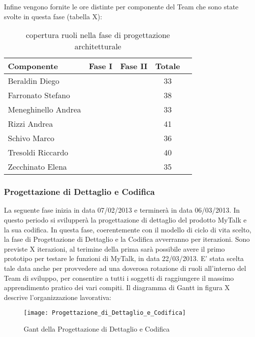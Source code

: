 Infine vengono fornite le ore distinte per componente del Team che sono state svolte in questa fase (tabella X):\\
\begin{table}[h]
\centering
\begin{tabular}{|l|c|c|cl|}
\hline
Componente& Fase I& Fase II& Totale& \\
\hline
Beraldin Diego & & & 33&\\
Farronato Stefano & & & 38&\\
Meneghinello Andrea & & & 33&\\
Rizzi Andrea & & & 41&\\
Schivo Marco & & & 36&\\
Tresoldi Riccardo & & & 40&\\
Zecchinato Elena & & & 35&\\
\hline
\end{tabular}
\caption{copertura ruoli nella fase di progettazione architetturale}
\end{table}


\subsubsection{Progettazione di Dettaglio e Codifica}
La seguente fase inizia in data 07/02/2013 e terminerà in data 06/03/2013. In questo periodo si svilupperà la progettazione di dettaglio del prodotto MyTalk e la sua codifica.
In questa fase, coerentemente con il modello di ciclo di vita scelto, la fase di Progettazione di Dettaglio e la Codifica avverranno per iterazioni.
Sono previste X iterazioni, al terimine della prima sarà possibile avere il primo prototipo per testare le funzioni di MyTalk, in data 22/03/2013.
E' stata scelta tale data anche per provvedere ad una doverosa rotazione di ruoli all'interno del Team di sviluppo, per consentire a tutti i soggetti di raggiungere il massimo apprendimento pratico dei vari compiti.
Il diagramma di Gantt in figura X descrive l'organizzazione lavorativa:\\

\begin{figure}[h]
  \texttt{[image: Progettazione\_di\_Dettaglio\_e\_Codifica]}
\caption{Gant della Progettazione di Dettaglio e Codifica}
\end{figure}


